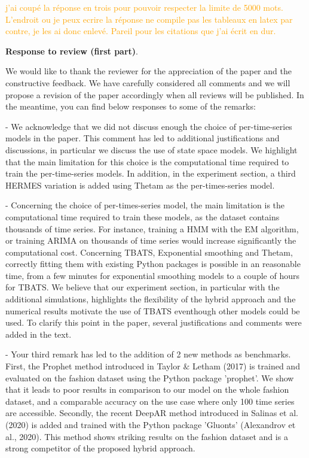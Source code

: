 \documentclass[10pt]{article} %
\begin{document}
\textcolor{orange}{j'ai coupé la réponse en trois pour pouvoir respecter la limite de 5000 mots. L'endroit ou je peux ecrire la réponse ne compile pas les tableaux en latex par contre, je les ai donc enlevé. Pareil pour les citations que j'ai écrit en dur.}
\bigskip

\textbf{Response to review (first part)}.\vspace{0.2cm}

We would like to thank the reviewer for the appreciation of the paper and the constructive feedback. We have carefully considered all comments and we will propose a revision of the paper accordingly when all reviews will be published. In the meantime, you can find below responses to some of the remarks:


- We acknowledge that we did not discuss enough the choice of per-time-series models in the paper. This comment has led to additional justifications and discussions, in particular we discuss the use of state space models. We highlight that the main limitation for this choice is the computational time required to train the per-time-series models. In addition, in the experiment section, a third HERMES variation is added using Thetam as the per-times-series model.
	
- Concerning the choice of per-times-series model, the main limitation is the computational time required to train these models, as the dataset contains thousands of time series. For instance, training a HMM with the EM algorithm, or training ARIMA on thousands of time series would increase significantly the computational cost. Concerning TBATS, Exponential smoothing and Thetam, correctly fitting them with existing Python packages is possible in an reasonable time, from a few minutes for exponential smoothing models to a couple of hours for TBATS. We believe that our experiment section, in particular with the additional simulations, highlights the flexibility of the hybrid approach and the numerical results motivate the use of TBATS eventhough other models could be used. To clarify this point in the paper, several justifications and comments were added in the text.
	
- Your third remark has led to the addition of 2 new methods as benchmarks. First, the Prophet method introduced in Taylor $\&$ Letham (2017) is trained and evaluated on the fashion dataset using the Python package 'prophet'. We show that it leads to poor results in comparison to our model on the whole fashion dataset, and a comparable accuracy on the use case where only 100 time series are accessible. Secondly, the recent DeepAR method introduced in Salinas et al. (2020) is added  and trained with the Python package 'Gluonts' (Alexandrov et al., 2020). This method shows striking results on the fashion dataset and is a strong competitor of the proposed hybrid approach.
\end{document}
